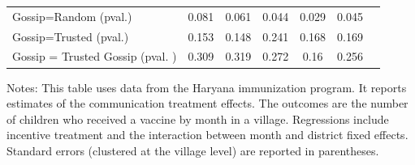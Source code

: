 \begin{table}[!h]
{\begin{threeparttable}
\begin{tabular}{lcccccc}
Gossip=Random (pval.)  & 0.081 & 0.061 & 0.044 & 0.029 & 0.045 \\ 
Gossip=Trusted (pval.) & 0.153 & 0.148 & 0.241 & 0.168 & 0.169 \\ 
Gossip = Trusted Gossip (pval. ) & 0.309 & 0.319 & 0.272 & 0.16 & 0.256 \\ 
\hline 
\end{tabular}
		\begin{tablenotes}
 Notes: This table uses data from the Haryana immunization program. It reports estimates of the communication treatment effects. The outcomes are the number of children who received a vaccine by month in a village. Regressions include incentive treatment and the interaction between month and district fixed effects. Standard errors (clustered at the village level) are reported in parentheses.
		\end{tablenotes}
		\end{threeparttable}
	}
\end{table}
